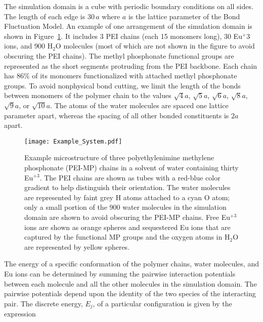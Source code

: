 \documentclass[
journal=jcisd8, %
manuscript=article,
layout=twocolumn   %
]{achemso}
\begin{document}
The simulation domain is a cube with periodic boundary conditions on all sides. The length of each edge is $30 \, a$ where $a$ is the lattice parameter of the Bond Fluctuation Model. An example of one arrangement of the simulation domain is shown in Figure~\ref{ExampleSystemMicrostructure}. It includes 3 PEI chains (each 15 monomers long), 30 Eu$^+3$ ions, and 900 H$_2$O molecules (most of which are not shown in the figure to avoid obscuring the PEI chains). The methyl phosphonate functional groups are represented as the short segments protruding from the PEI backbone. Each chain has 86\% of its monomers functionalized with attached methyl phosphonate groups. To avoid nonphysical bond cutting, we limit the length of the bonds between monomers of the polymer chain to the values $\sqrt{4}a$, $\sqrt{5}a$, $\sqrt{6}a$, $\sqrt{8}a$, $\sqrt{9}a$, or $\sqrt{10}a$. The atoms of the water molecules are spaced one lattice parameter apart, whereas the spacing of all other bonded constituents is $2a$ apart.

\begin{figure}[ht!]
	\begin{center}
		\texttt{[image: Example\_System.pdf]}
		\caption{Example microstructure of three polyethylenimine methylene phosphonate (PEI-MP) chains in a solvent of water containing thirty Eu$^{+3}$. The PEI chains are shown as tubes with a red-blue color gradient to help distinguish their orientation. The water molecules are represented by faint grey H atoms attached to a cyan O atom; only a small portion of the 900 water molecules in the simulation domain are shown to avoid obscuring the PEI-MP chains. Free Eu$^{+3}$ ions are shown as orange spheres and sequestered Eu ions that are captured by the functional MP groups and the oxygen atoms in H$_2$O are represented by yellow spheres.}
		\label{ExampleSystemMicrostructure}
	\end{center}
\end{figure}

The energy of a specific conformation of the polymer chains, water molecules, and Eu ions can be determined by summing the pairwise interaction potentials between each molecule and all the other molecules in the simulation domain. The pairwise potentials depend upon the identity of the two species of the interacting pair. The discrete energy, $E_j$, of a particular configuration is given by the expression
\end{document}
